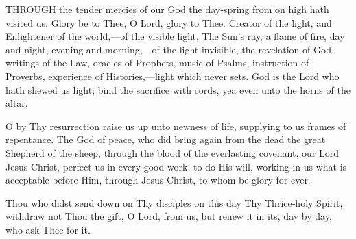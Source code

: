 


THROUGH the tender mercies of our God the day‑spring from on high hath visited us. Glory be to Thee, O Lord, glory to Thee. Creator of the light, and Enlightener of the world,—of the visible light, The Sun’s ray, a flame of fire, day and night, evening and morning,—of the light invisible, the revelation of God, writings of the Law, oracles of Prophets, music of Psalms, instruction of Proverbs, experience of Histories,—light which never sets. God is the Lord who hath shewed us light; bind the sacrifice with cords, yea even unto the horns of the altar.

O by Thy resurrection raise us up unto newness of life, supplying to us frames of repentance. The God of peace, who did bring again from the dead the great Shepherd of the sheep, through the blood of the everlasting covenant, our Lord Jesus Christ, perfect us in every good work, to do His will, working in us what is acceptable before Him, through Jesus Christ, to whom be glory for ever.

Thou who didst send down on Thy disciples on this day Thy Thrice‑holy Spirit, withdraw not Thou the gift, O Lord, from us, but renew it in its, day by day, who ask Thee for it.


